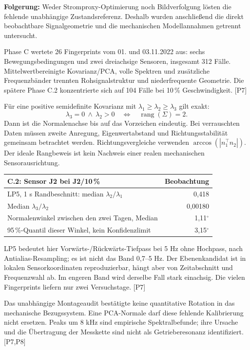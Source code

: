 \documentclass[11pt,a4paper]{article}
\newcommand{\src}[1]{{\footnotesize\color{muted}[#1]}}
\begin{document}
\textbf{Folgerung:} Weder Stromproxy-Optimierung noch Bildverfolgung lösten die fehlende unabhängige Zustandsreferenz. Deshalb wurden anschließend die direkt beobachtbare Signalgeometrie und die mechanischen Modellannahmen getrennt untersucht.

Phase C wertete 26 Fingerprints vom 01. und 03.11.2022 aus: sechs Bewegungsbedingungen und zwei dreiachsige Sensoren, insgesamt 312 Fälle. Mittelwertbereinigte Kovarianz/PCA, volle Spektren und zusätzliche Frequenzbänder trennten Rohsignalstruktur und niederfrequente Geometrie. Die spätere Phase C.2 konzentrierte sich auf 104 Fälle bei 10\,\% Geschwindigkeit. \src{P7}

Für eine positive semidefinite Kovarianz mit $\lambda_1\geq\lambda_2\geq\lambda_3$ gilt exakt:
\[
\lambda_3=0\ \land\ \lambda_2>0\quad\Longleftrightarrow\quad\operatorname{rang}(\Sigma)=2.
\]
Dann ist die Normalenachse bis auf das Vorzeichen eindeutig. Bei verrauschten Daten müssen zweite Anregung, Eigenwertabstand und Richtungsstabilität gemeinsam betrachtet werden. Richtungsvergleiche verwenden $\arccos(|n_1^\top n_2|)$. Der ideale Rangbeweis ist kein Nachweis einer realen mechanischen Sensorausrichtung.

\begin{tabularx}{\linewidth}{Y r}
\toprule C.2: Sensor J2 bei J2/10\,\% & Beobachtung\\\midrule
LP5, 1 s Randbeschnitt: median $\lambda_2/\lambda_1$ & 0,418\\
Median $\lambda_3/\lambda_2$ & 0,00180\\
Normalenwinkel zwischen den zwei Tagen, Median & 1,11$^\circ$\\
95\,\%-Quantil dieser Winkel, kein Konfidenzlimit & 3,15$^\circ$\\\bottomrule
\end{tabularx}
\smallskip LP5 bedeutet hier Vorwärts-/Rückwärts-Tiefpass bei 5 Hz ohne Hochpass, nach Antialias-Resampling; es ist nicht das Band 0,7--5 Hz. Der Ebenenkandidat ist in lokalen Sensorkoordinaten reproduzierbar, hängt aber von Zeitabschnitt und Frequenzwahl ab. Im engeren Band wird derselbe Fall stark einachsig. Die vielen Fingerprints liefern nur zwei Versuchstage. \src{P7}

Das unabhängige Montageaudit bestätigte keine quantitative Rotation in das mechanische Bezugssystem. Eine PCA-Normale darf diese fehlende Kalibrierung nicht ersetzen. Peaks um 8 kHz sind empirische Spektralbefunde; ihre Ursache und die Übertragung der Messkette sind nicht als Getrieberesonanz identifiziert. \src{P7,P8}
\end{document}
